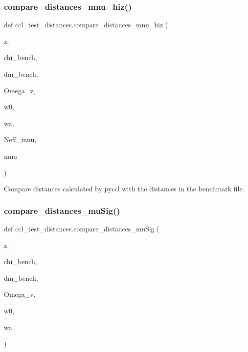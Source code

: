 \subsubsection{\texorpdfstring{compare\+\_\+distances\+\_\+mnu\+\_\+hiz()}{compare\_distances\_mnu\_hiz()}}
{\footnotesize\ttfamily def ccl\+\_\+test\+\_\+distances.\+compare\+\_\+distances\+\_\+mnu\+\_\+hiz (\begin{DoxyParamCaption}\item[{}]{z,  }\item[{}]{chi\+\_\+bench,  }\item[{}]{dm\+\_\+bench,  }\item[{}]{Omega\+\_\+v,  }\item[{}]{w0,  }\item[{}]{wa,  }\item[{}]{Neff\+\_\+mnu,  }\item[{}]{mnu }\end{DoxyParamCaption})}

\begin{DoxyVerb}Compare distances calculated by pyccl with the distances in the benchmark
file.
\end{DoxyVerb}
 \mbox{\label{namespaceccl__test__distances_aff1f59a0cf4bbcf78ceb0a65b9281083}} 
\subsubsection{\texorpdfstring{compare\+\_\+distances\+\_\+mu\+Sig()}{compare\_distances\_muSig()}}
{\footnotesize\ttfamily def ccl\+\_\+test\+\_\+distances.\+compare\+\_\+distances\+\_\+mu\+Sig (\begin{DoxyParamCaption}\item[{}]{z,  }\item[{}]{chi\+\_\+bench,  }\item[{}]{dm\+\_\+bench,  }\item[{}]{Omega\+\_\+v,  }\item[{}]{w0,  }\item[{}]{wa }\end{DoxyParamCaption})}

